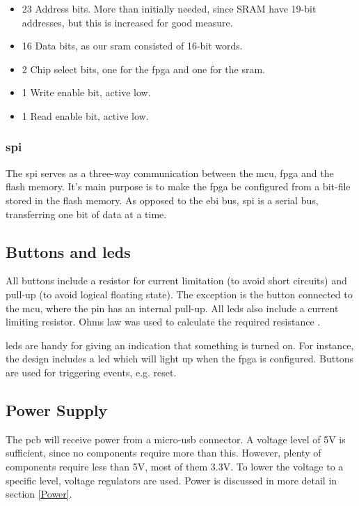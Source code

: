 \begin{itemize}
\item 23 Address bits. More than initially needed, since SRAM have 19-bit addresses, but this is increased for good measure.
\item 16 Data bits, as our \gls{sram} consisted of 16-bit words.
\item 2 Chip select bits, one for the \gls{fpga} and one for the \gls{sram}.
\item 1 Write enable bit, active low.
\item 1 Read enable bit, active low.
\end{itemize}

\subsubsection{\gls{spi}}
The \gls{spi} serves as a three-way communication between the \gls{mcu}, \gls{fpga} and the flash memory.
It's main purpose is to make the \gls{fpga} be configured from a bit-file stored in the flash memory.
As opposed to the \gls{ebi} bus, \gls{spi} is a serial bus, transferring one bit of data at a time.

\subsection{Buttons and \gls{led}s}
All buttons include a resistor for current limitation (to avoid short circuits) and pull-up (to avoid logical floating state).
The exception is the button connected to the \gls{mcu}, where the pin has an internal pull-up.
All \gls{led}s also include a current limiting resistor.
Ohms law was used to calculate the required resistance \cite{ohm}.

\gls{led}s are handy for giving an indication that something is turned on.
For instance, the design includes a \gls{led} which will light up when the \gls{fpga} is configured.
Buttons are used for triggering events, e.g. reset.

\subsection{Power Supply}
The \gls{pcb} will receive power from a micro-\gls{usb} connector.
A voltage level of 5V is sufficient, since no components require more than this.
However, plenty of components require less than 5V, most of them 3.3V.
To lower the voltage to a specific level, voltage regulators are used.
Power is discussed in more detail in section \ref{Power}.

